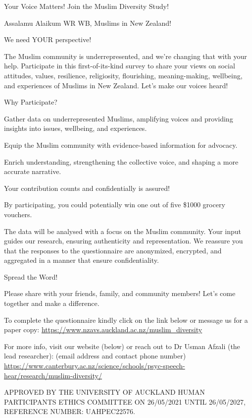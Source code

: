 \documentclass[
]{interact}
\begin{document}
Your Voice Matters! Join the Muslim Diversity Study!

\noindent Assalamu Alaikum WR WB, Muslims in New Zealand!

\noindent We need YOUR perspective!

\noindent The Muslim community is underrepresented, and we're changing
that with your help. Participate in this first-of-its-kind survey to
share your views on social attitudes, values, resilience, religiosity,
flourishing, meaning-making, wellbeing, and experiences of Muslims in
New Zealand. Let's make our voices heard!

\noindent Why Participate?

\noindent Gather data on underrepresented Muslims, amplifying voices and
providing insights into issues, wellbeing, and experiences.

\noindent Equip the Muslim community with evidence-based information for
advocacy.

\noindent Enrich understanding, strengthening the collective voice, and
shaping a more accurate narrative.

\noindent Your contribution counts and confidentially is assured!

\noindent By participating, you could potentially win one out of five
\$1000 grocery vouchers.

\noindent The data will be analysed with a focus on the Muslim
community. Your input guides our research, ensuring authenticity and
representation. We reassure you that the responses to the questionnaire
are anonymized, encrypted, and aggregated in a manner that ensure
confidentiality.

\noindent Spread the Word!

\noindent Please share with your friends, family, and community members!
Let's come together and make a difference.

\noindent To complete the questionnaire kindly click on the link below
or message us for a paper copy:
\url{https://www.nzavs.auckland.ac.nz/muslim_diversity}

\noindent For more info, visit our website (below) or reach out to Dr
Usman Afzali (the lead researcher): (email address and contact phone
number)
\url{https://www.canterbury.ac.nz/science/schools/psyc-speech-hear/research/muslim-diversity/}

\noindent APPROVED BY THE UNIVERSITY OF AUCKLAND HUMAN PARTICIPANTS
ETHICS COMMITTEE ON 26/05/2021 UNTIL 26/05/2027, REFERENCE NUMBER:
UAHPEC22576.
\end{document}
